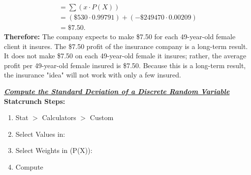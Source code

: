 \documentclass{report}
\begin{document}
\begin{mdframed}
\begin{align*}
          = \sum (x \cdot P(X)) \\
          = (\$530 \cdot 0.99791) + (-\$249470 \cdot 0.00209) \\
          = \$7.50
      .\end{align*}
      \bigbreak \noindent 
      \textbf{Therefore:}
      \bigbreak \noindent 
      The company expects to make \$7.50 for each 49-year-old female client it insures. The \$7.50 profit of the insurance company is a long-term result. It does not make \$7.50 on each 49-year-old female it insures; rather, the average profit per 49-year-old female insured is \$7.50. Because this is a long-term result, the insurance "idea" will not work with only a few insured.
      \end{mdframed}


      \pagebreak \bigbreak \noindent 
      \textbf{\textit{\underline{Compute the Standard Deviation of a Discrete Random Variable}}}
      \bigbreak \noindent 
      \textbf{Statcrunch Steps:}
      \begin{enumerate}
          \item Stat $> $ Calculators $> $ Custom
        \item Select Values in:
        \item Select Weights in (P(X)):
        \item Compute
      \end{enumerate}

      \pagebreak 
\end{document}
